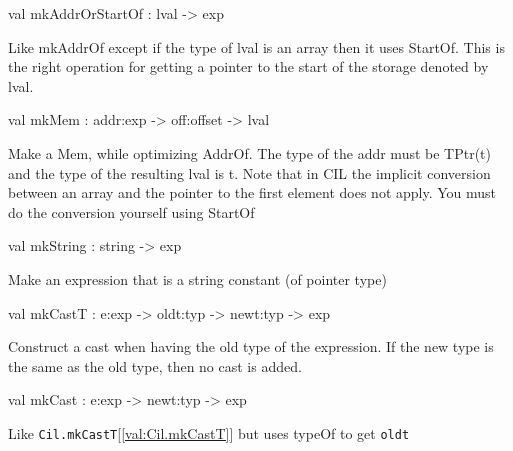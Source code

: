 \documentclass[11pt]{article}
\begin{document}
\label{val:Cil.mkAddrOrStartOf}\begin{ocamldoccode}
val mkAddrOrStartOf : lval -> exp
\end{ocamldoccode}
\begin{ocamldocdescription}
Like mkAddrOf except if the type of lval is an array then it uses 
    StartOf. This is the right operation for getting a pointer to the start 
    of the storage denoted by lval.


\end{ocamldocdescription}




\label{val:Cil.mkMem}\begin{ocamldoccode}
val mkMem : addr:exp -> off:offset -> lval
\end{ocamldoccode}
\begin{ocamldocdescription}
Make a Mem, while optimizing AddrOf. The type of the addr must be 
    TPtr(t) and the type of the resulting lval is t. Note that in CIL the 
    implicit conversion between an array and the pointer to the first 
    element does not apply. You must do the conversion yourself using 
    StartOf


\end{ocamldocdescription}




\label{val:Cil.mkString}\begin{ocamldoccode}
val mkString : string -> exp
\end{ocamldoccode}
\begin{ocamldocdescription}
Make an expression that is a string constant (of pointer type)


\end{ocamldocdescription}




\label{val:Cil.mkCastT}\begin{ocamldoccode}
val mkCastT : e:exp -> oldt:typ -> newt:typ -> exp
\end{ocamldoccode}
\begin{ocamldocdescription}
Construct a cast when having the old type of the expression. If the new 
 type is the same as the old type, then no cast is added.


\end{ocamldocdescription}




\label{val:Cil.mkCast}\begin{ocamldoccode}
val mkCast : e:exp -> newt:typ -> exp
\end{ocamldoccode}
\begin{ocamldocdescription}
Like {\tt{Cil.mkCastT}}[\ref{val:Cil.mkCastT}] but uses typeOf to get {\tt{oldt}}


\end{ocamldocdescription}
\end{document}

